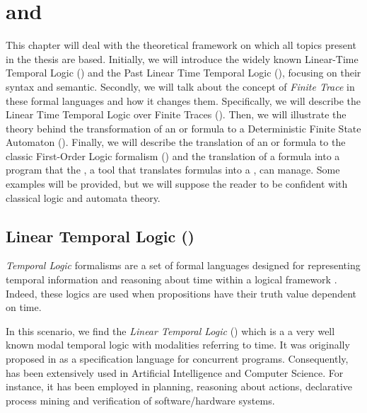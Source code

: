 \chapter{\PLTL and \LTLf}
This chapter will deal with the theoretical framework on which all topics present in the thesis are based. Initially, we will introduce the widely known Linear-Time Temporal Logic (\LTL) and the Past Linear Time Temporal Logic (\PLTL), focusing on their syntax and semantic. Secondly, we will talk about the concept of \textit{Finite Trace} in these formal languages and how it changes them. Specifically, we will describe the Linear Time Temporal Logic over Finite Traces (\LTLf). Then, we will illustrate the theory behind the transformation of an \LTLf or \PLTL formula to a Deterministic Finite State Automaton (\DFA). Finally, we will describe the translation of an \LTLf or \PLTL formula to the classic First-Order Logic formalism (\FOL) and the translation of a \FOL formula into a program that the \MONA, a tool that translates formulas into a \DFA, can manage. Some examples will be provided, but we will suppose the reader to be confident with classical logic and automata theory.
\section{Linear Temporal Logic (\LTL)}\label{sec:ltl-definition}
\textit{Temporal Logic} formalisms are a set of formal languages designed for representing temporal information and reasoning about time within a logical framework \citep{sep-logic-temporal}. Indeed, these logics are used when propositions have their truth value dependent on time.

In this scenario, we find the \textit{Linear Temporal Logic} (\LTL) which is a a very well known modal temporal logic with modalities referring to time. It was originally proposed in \citep{Pnueli:1977:TLP:1382431.1382534} as a specification language for concurrent programs. Consequently, \LTL has been extensively used in Artificial Intelligence and Computer Science. For instance, it has been employed in planning, reasoning about actions, declarative process mining and verification of software/hardware systems.
